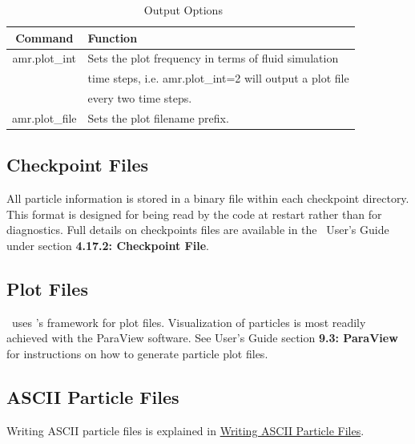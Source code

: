 \begin{table}
\begin{center}
  \begin{tabular}{||c| l||}
    \hline
    Command & Function \\ [0.5ex]
    \hline\hline
    {\sf amr.plot\_int} & Sets the plot frequency in terms of fluid simulation\\
                        & time steps, i.e. {\sf amr.plot\_int=2} will output a
                          plot file \\
                        & every two time steps. \\
     \hline
    {\sf amr.plot\_file} & Sets the plot filename prefix. \\
     \hline
  \end{tabular}
\end{center}
\caption{\amrex\ Output Options}
\label{table:amropts}
\end{table}

\subsection{Checkpoint Files}

All particle information is stored in a binary file within each checkpoint
directory. This format is designed for being read by the code at restart rather
than for diagnostics. Full details on checkpoints files are available in the
\amrex\ User's Guide under section {\bf 4.17.2: Checkpoint File}.


\subsection{Plot Files}

\mfix\ uses \amrex's framework for plot files. Visualization of particles is
most readily achieved with the ParaView software. See \amrex User's Guide section
{\bf 9.3: ParaView} for instructions on how to generate particle plot files.


\subsection{ASCII Particle Files}
Writing ASCII particle files is explained in \hyperref[sec:AsciiFiles]{Writing ASCII
Particle Files}.







